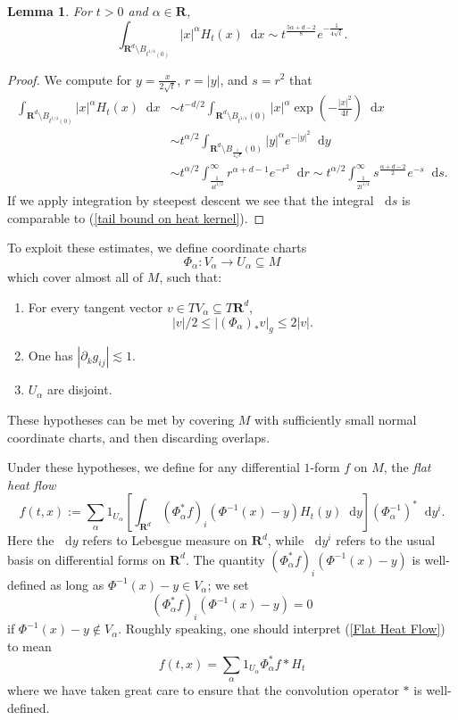 \documentclass[reqno,11pt]{amsart}
\newcommand{\RR}{\mathbf{R}}
\newcommand*\dif{\mathop{}\!\mathrm{d}}
\newcommand{\dfn}[1]{\emph{#1}\index{#1}}
\newtheorem{lemma}[theorem]{Lemma}
\theoremstyle{definition}
\numberwithin{equation}{section}
\begin{document}
\begin{lemma}
For $t > 0$ and $\alpha \in \RR$,
\begin{equation}
\int_{\RR^d \setminus B_{t^{1/4}(0)}} |x|^\alpha H_t(x) \dif x \sim t^{\frac{5\alpha + d - 2}{8}} e^{-\frac{1}{4\sqrt t}}. \label{tail bound on heat kernel}
\end{equation}
\end{lemma}
\begin{proof}
We compute for $y = \frac{x}{2 \sqrt t}$, $r = |y|$, and $s = r^2$ that
\begin{align*}
\int_{\RR^d \setminus B_{t^{1/4}(0)}} |x|^\alpha H_t(x) \dif x 
&\sim t^{-d/2} \int_{\RR^d \setminus B_{t^{1/4}}(0)} |x|^\alpha \exp\left(-\frac{|x|^2}{4t}\right) \dif x \\
&\sim t^{\alpha/2} \int_{\RR^d \setminus B_{\frac{1}{4 \sqrt t}}(0)} |y|^\alpha e^{-|y|^2} \dif y \\
&\sim t^{\alpha/2} \int_{\frac{1}{4t^{1/2}}}^\infty r^{\alpha + d - 1} e^{-r^2} \dif r 
\sim t^{\alpha/2} \int_{\frac{1}{2t^{1/4}}}^\infty s^{\frac{\alpha + d - 2}{2}} e^{-s} \dif s.
\end{align*}
If we apply integration by steepest descent we see that the integral $\dif s$ is comparable to (\ref{tail bound on heat kernel}).
\end{proof}

To exploit these estimates, we define coordinate charts
$$\Phi_\alpha: V_\alpha \to U_\alpha \subseteq M$$
which cover almost all of $M$, such that:
\begin{enumerate}
\item For every tangent vector $v \in TV_\alpha \subseteq T\RR^d$,
\begin{equation}\label{comparable metrics}
|v|/2 \leq |(\Phi_\alpha)_* v|_g \leq 2|v|.
\end{equation}
\item One has $|\partial_k g_{ij}| \lesssim 1$.
\item $U_\alpha$ are disjoint.
\end{enumerate}
These hypotheses can be met by covering $M$ with sufficiently small normal coordinate charts, and then discarding overlaps.

Under these hypotheses, we define for any differential $1$-form $f$ on $M$, the \dfn{flat heat flow}
\begin{equation}\label{Flat Heat Flow}
f(t, x) := \sum_\alpha 1_{U_\alpha} \left[\int_{\RR^d} (\Phi_\alpha^* f)_i(\Phi^{-1}(x) - y) H_t(y) \dif y\right] (\Phi_\alpha^{-1})^* \dif y^i.
\end{equation}
Here the $\dif y$ refers to Lebesgue measure on $\RR^d$, while $\dif y^i$ refers to the usual basis on differential forms on $\RR^d$.
The quantity $(\Phi_\alpha^* f)_i(\Phi^{-1}(x) - y)$ is well-defined as long as $\Phi^{-1}(x) - y \in V_\alpha$; we set
$$(\Phi_\alpha^* f)_i(\Phi^{-1}(x) - y) = 0$$
if $\Phi^{-1}(x) - y \notin V_\alpha$.
Roughly speaking, one should interpret (\ref{Flat Heat Flow}) to mean
$$f(t, x) = \sum_\alpha 1_{U_\alpha} \Phi_\alpha^* f * H_t$$
where we have taken great care to ensure that the convolution operator $*$ is well-defined.
\end{document}
